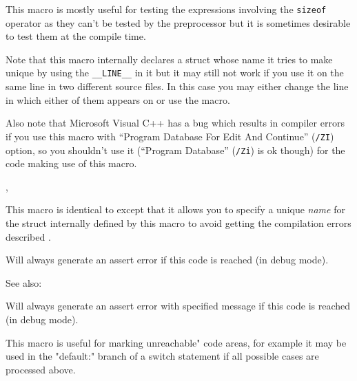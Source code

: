 This macro is mostly useful for testing the expressions involving the
{\tt sizeof} operator as they can't be tested by the preprocessor but it is
sometimes desirable to test them at the compile time.

Note that this macro internally declares a struct whose name it tries to make
unique by using the {\tt \_\_LINE\_\_} in it but it may still not work if you
use it on the same line in two different source files. In this case you may
either change the line in which either of them appears on or use the
 macro.

Also note that Microsoft Visual C++ has a bug which results in compiler errors
if you use this macro with ``Program Database For Edit And Continue''
(\texttt{/ZI}) option, so you shouldn't use it (``Program Database''
(\texttt{/Zi}) is ok though) for the code making use of this macro.


,\\


\label{wxcompiletimeassert2}


This macro is identical to 
except that it allows you to specify a unique {\it name} for the struct
internally defined by this macro to avoid getting the compilation errors
described .


\label{wxfail}


Will always generate an assert error if this code is reached (in debug mode).

See also: 


\label{wxfailmsg}


Will always generate an assert error with specified message if this code is reached (in debug mode).

This macro is useful for marking unreachable" code areas, for example
it may be used in the "default:" branch of a switch statement if all possible
cases are processed above.


